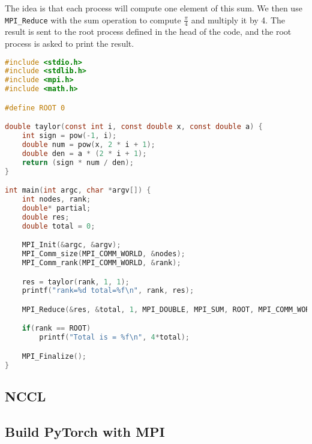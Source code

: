 The idea is that each process will compute one element of this sum. We then use \lstinline{MPI_Reduce} with the sum operation to compute \(\frac{\pi}{4}\) and multiply it by 4. The result is sent to the root process defined in the head of the code, and the root process is asked to print the result.

\begin{lstlisting}[language=C]
#include <stdio.h>
#include <stdlib.h>
#include <mpi.h>
#include <math.h>

#define ROOT 0

double taylor(const int i, const double x, const double a) {
    int sign = pow(-1, i);
    double num = pow(x, 2 * i + 1);
    double den = a * (2 * i + 1);
    return (sign * num / den);
}

int main(int argc, char *argv[]) {
    int nodes, rank;
    double* partial;
    double res;
    double total = 0;

    MPI_Init(&argc, &argv);
    MPI_Comm_size(MPI_COMM_WORLD, &nodes);
    MPI_Comm_rank(MPI_COMM_WORLD, &rank);

    res = taylor(rank, 1, 1);
    printf("rank=%d total=%f\n", rank, res);

    MPI_Reduce(&res, &total, 1, MPI_DOUBLE, MPI_SUM, ROOT, MPI_COMM_WORLD);

    if(rank == ROOT)
        printf("Total is = %f\n", 4*total);

    MPI_Finalize();
}
\end{lstlisting}

\subsection{NCCL}

\subsection{Build PyTorch with MPI}

